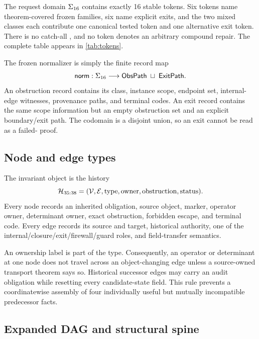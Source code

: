 The request domain $\Sigma_{16}$ contains exactly 16 stable tokens.  Six tokens
name theorem-covered frozen families, six name explicit exits, and the two
mixed classes each contribute one canonical tested token and one alternative
exit token.  There is no catch-all , and no token denotes
an arbitrary compound repair.  The complete table appears in
\cref{tab:tokens}.

The frozen normalizer is simply the finite record map
\begin{equation}
\mathsf{norm}:\Sigma_{16}\longrightarrow
  \mathsf{ObsPath}\;\sqcup\;\mathsf{ExitPath}.
\label{eq:normalizer}
\end{equation}
An obstruction record contains its class, instance scope, endpoint set,
internal-edge witnesses, provenance paths, and terminal codes.  An exit record
contains the same scope information but an empty obstruction set and an
explicit boundary/exit path.  The codomain is a disjoint union, so an exit
cannot be read as a failed-\Good{} proof.

\subsection{Node and edge types}

The invariant object is the history
\begin{equation}
\mathcal H_{35:38}=(\mathcal V,\mathcal E,\operatorname{type},\operatorname{owner},
  \operatorname{obstruction},\operatorname{status}).
\label{eq:history}
\end{equation}
Every node records an inherited obligation, source object, marker, operator
owner, determinant owner, exact obstruction, forbidden escape, and terminal
code.  Every edge records its source and target, historical authority, one of
the internal/closure/exit/firewall/guard roles, and field-transfer semantics.

An ownership label is part of the type.  Consequently, an operator or
determinant at one node does not travel across an object-changing edge unless a
source-owned transport theorem says so.  Historical successor edges may carry
an audit obligation while resetting every candidate-state field.  This rule
prevents a coordinatewise assembly of four individually useful but mutually
incompatible predecessor facts.

\subsection{Expanded DAG and structural spine}

